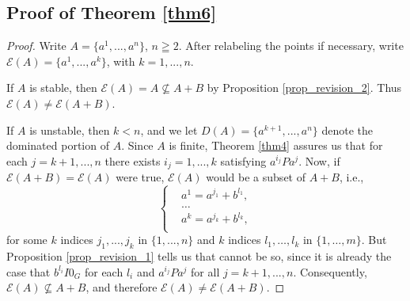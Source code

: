 \documentclass[pdflatex,sn-apa,11pt]{sn-jnl}%
\begin{document}
\subsection{Proof of Theorem \ref{thm6}}
\label{sec5_4}
\begin{proof}
 Write $A = \{a^1, ..., a^n\}$, $n \geqq 2$. After relabeling the points if necessary, write $\mathscr{E}(A) = \{a^1, ..., a^k\}$, with $k = 1, ..., n$. 
    
    If $A$ is stable, then $\mathscr{E}(A) = A \not\subseteq A+B$ by Proposition \ref{prop_revision_2}. Thus $\mathscr{E}(A) \neq \mathscr{E}(A+B)$. 
    
    If $A$ is unstable, then $k < n$, and we let $D(A) = \{a^{k+1}, ..., a^{n}\}$ denote the dominated portion of $A$. Since $A$ is finite, Theorem \ref{thm4} assures us that for each $j = k+1, ..., n$ there exists $i_j = 1, ..., k$ satisfying $a^{i_j}Pa^{j}$. Now, if $\mathscr{E}(A+B) = \mathscr{E}(A)$ were true, $\mathscr{E}(A)$ would be a subset of $A+B$, i.e.,
    \begin{equation*}
  \left\{
    \begin{aligned}
      & a^1 = a^{j_1} + b^{l_1}, \\
      & \dots \\
      & a^k = a^{j_k} + b^{l_k}, \\
    \end{aligned}
  \right.
\end{equation*}
for some $k$ indices $j_1, ..., j_k$ in $\{1, ..., n\}$ and $k$ indices $l_1, \dots, l_k$ in $\{1, \dots, m\}$. But Proposition \ref{prop_revision_1} tells us that cannot be so, since it is already the case that $b^{l_i}I0_G$ for each $l_i$ and $a^{i_j}Pa^{j}$ for all $j = k+1, ..., n$. Consequently, $\mathscr{E}(A) \not \subseteq A+B$, and therefore $\mathscr{E}(A) \neq \mathscr{E}(A+B)$.
\end{proof}
\end{document}
